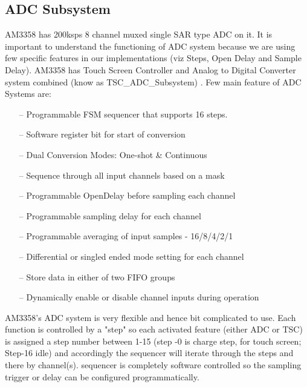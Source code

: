 \subsection{ADC Subsystem}
AM3358 has 200ksps 8 channel muxed single SAR type ADC on it. It is important to understand the functioning of ADC system because we are using few specific features in our implementations (viz Steps, Open Delay and Sample Delay). AM3358 has Touch Screen Controller and Analog to Digital Converter system combined (know as TSC\_ADC\_Subsystem) \cite{AM3358TRM} . Few main feature of ADC Systems are: 
\begin{itemize}
	\item[--] Programmable FSM sequencer that supports 16 steps.
	\item[--] Software register bit for start of conversion
	\item[--] Dual Conversion Modes: One-shot \& Continuous
	\item[--] Sequence through all input channels based on a mask
	\item[--] Programmable OpenDelay before sampling each channel
	\item[--] Programmable sampling delay for each channel
	\item[--] Programmable averaging of input samples - 16/8/4/2/1
	\item[--] Differential or singled ended mode setting for each channel
	\item[--] Store data in either of two FIFO groups
	\item[--] Dynamically enable or disable channel inputs during operation
\end{itemize}
AM3358's ADC system is very flexible and hence bit complicated to use. Each function is controlled by a "step" so each activated feature (either ADC or TSC) is assigned a step number between 1-15 (step -0 is charge step, for touch screen; Step-16 idle) and accordingly the sequencer will iterate through the steps and there by channel(s). sequencer is completely software controlled so the sampling trigger or delay can be configured programmatically.
